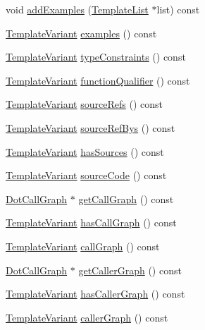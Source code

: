 \begin{DoxyCompactItemize}
\item 
void \hyperlink{class_member_context_1_1_private_a58d4d6ce4c23634d090b8867f6e0ea8e}{add\+Examples} (\hyperlink{class_template_list}{Template\+List} $\ast$list) const 
\item 
\hyperlink{class_template_variant}{Template\+Variant} \hyperlink{class_member_context_1_1_private_a4a3c1e6414caf813343e1df02185fba1}{examples} () const 
\item 
\hyperlink{class_template_variant}{Template\+Variant} \hyperlink{class_member_context_1_1_private_af6fd1e31ad7d29167529c0f9c32dd87e}{type\+Constraints} () const 
\item 
\hyperlink{class_template_variant}{Template\+Variant} \hyperlink{class_member_context_1_1_private_a0dc8a41211744f346e6af02ea1cb0e4d}{function\+Qualifier} () const 
\item 
\hyperlink{class_template_variant}{Template\+Variant} \hyperlink{class_member_context_1_1_private_a3bd270e8c1e2a49397e8b350671f4e11}{source\+Refs} () const 
\item 
\hyperlink{class_template_variant}{Template\+Variant} \hyperlink{class_member_context_1_1_private_a8dbc7fe95d204eed8cf0bcc1d4a0ad6a}{source\+Ref\+Bys} () const 
\item 
\hyperlink{class_template_variant}{Template\+Variant} \hyperlink{class_member_context_1_1_private_ad793b647c835d828a4f51b6c5aaac01a}{has\+Sources} () const 
\item 
\hyperlink{class_template_variant}{Template\+Variant} \hyperlink{class_member_context_1_1_private_afaa6ad3b03a571a0ab562d1a4b888856}{source\+Code} () const 
\item 
\hyperlink{class_dot_call_graph}{Dot\+Call\+Graph} $\ast$ \hyperlink{class_member_context_1_1_private_a472d4b21a0548dd9efee49011ae5f79d}{get\+Call\+Graph} () const 
\item 
\hyperlink{class_template_variant}{Template\+Variant} \hyperlink{class_member_context_1_1_private_ad34320f688b3e76a1644b3c7d2c83d8b}{has\+Call\+Graph} () const 
\item 
\hyperlink{class_template_variant}{Template\+Variant} \hyperlink{class_member_context_1_1_private_a57123d2e8146562e5572882a5cff3083}{call\+Graph} () const 
\item 
\hyperlink{class_dot_call_graph}{Dot\+Call\+Graph} $\ast$ \hyperlink{class_member_context_1_1_private_a6b1e403fe9c26caaf271c70e9bd0879e}{get\+Caller\+Graph} () const 
\item 
\hyperlink{class_template_variant}{Template\+Variant} \hyperlink{class_member_context_1_1_private_a8b4b61cff0463ce47890e5bd09f28944}{has\+Caller\+Graph} () const 
\item 
\hyperlink{class_template_variant}{Template\+Variant} \hyperlink{class_member_context_1_1_private_a05f3b9ea1d5535244c8f5e4fdc929bad}{caller\+Graph} () const 
\end{DoxyCompactItemize}


